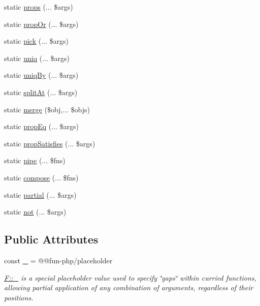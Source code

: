 \begin{DoxyCompactItemize}
static \hyperlink{classboehm__s_1_1F_a8379bded5dfb235caad236ab4c6f14c0}{props} (... \$args)
\item 
static \hyperlink{classboehm__s_1_1F_a0b5ab6c3448ef372f531576bc390d88a}{prop\+Or} (... \$args)
\item 
static \hyperlink{classboehm__s_1_1F_a1ed294c2887f1f3bb520236a993259fd}{pick} (... \$args)
\item 
static \hyperlink{classboehm__s_1_1F_a9015b4c01377f2a42e1ec9069f79d9e4}{uniq} (... \$args)
\item 
static \hyperlink{classboehm__s_1_1F_aaa4015fb11b07b71a3532631720852d9}{uniq\+By} (... \$args)
\item 
static \hyperlink{classboehm__s_1_1F_a7187437d20f86874a6c8115e0f8b3959}{split\+At} (... \$args)
\item 
static \hyperlink{classboehm__s_1_1F_ac833c309186225e5587fd45dfef22aca}{merge} (\$obj,... \$objs)
\item 
static \hyperlink{classboehm__s_1_1F_ada046f8c33b77f3d3ca40e12bc42c5db}{prop\+Eq} (... \$args)
\item 
static \hyperlink{classboehm__s_1_1F_a6d71ddfdd2b6c90fe356808bd332bb3f}{prop\+Satisfies} (... \$args)
\item 
static \hyperlink{classboehm__s_1_1F_a353205345113144a6fd6f874097377bc}{pipe} (... \$fns)
\item 
static \hyperlink{classboehm__s_1_1F_a1712c41e5be41e6f6e2088ed5d54a864}{compose} (... \$fns)
\item 
static \hyperlink{classboehm__s_1_1F_ab29a37d2aca75028895148da5da15b4b}{partial} (... \$args)
\item 
static \hyperlink{classboehm__s_1_1F_a0cf3df6448dbfa748f755494974d13ab}{not} (... \$args)
\end{DoxyCompactItemize}
\subsection*{Public Attributes}
\begin{DoxyCompactItemize}
\item 
const \hyperlink{classboehm__s_1_1F_ab837ec3c9abe3d1a244817fd4c18eda7}{\+\_\+} = \textquotesingle{}@@fun-\/php/placeholder\textquotesingle{}
\begin{DoxyCompactList}\small\item\em {\ttfamily \hyperlink{classboehm__s_1_1F_ab837ec3c9abe3d1a244817fd4c18eda7}{F\+::\+\_\+}} is a special placeholder value used to specify \char`\"{}gaps\char`\"{} within curried functions, allowing partial application of any combination of arguments, regardless of their positions. \end{DoxyCompactList}\end{DoxyCompactItemize}


